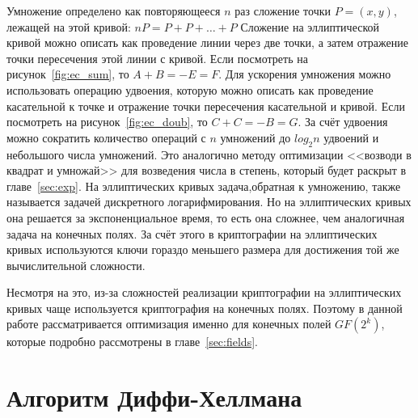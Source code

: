 \documentclass[times,specification,annotation]{itmo-student-thesis}
\begin{document}
Умножение определено как повторяющееся $n$ раз сложение точки $P=(x,y)$, лежащей на этой кривой: $nP=P+P+\dots+P$
Сложение на эллиптической кривой можно описать как проведение линии через две точки, а затем отражение точки пересечения этой линии с кривой.
Если посмотреть на рисунок~\ref{fig:ec_sum}, то $A+B=-E=F$.
Для ускорения умножения можно использовать операцию удвоения, которую можно описать как проведение касательной к точке и
отражение точки пересечения касательной и кривой.
Если посмотреть на рисунок~\ref{fig:ec_doub}, то $C+C=-B=G$.
За счёт удвоения можно сократить количество операций с $n$ умножений до $log_2 n$ удвоений и небольшого числа умножений.
Это аналогично методу оптимизации <<возводи в квадрат и умножай>> для возведения числа в степень, который будет раскрыт в главе~\ref{sec:exp}.
На эллиптических кривых задача,обратная к умножению, также называется задачей дискретного логарифмирования.
Но на эллиптических кривых она решается за экспоненциальное время, то есть она сложнее, чем аналогичная задача на конечных полях.
За счёт этого в криптографии на эллиптических кривых используются ключи гораздо меньшего размера для достижения той же вычислительной сложности.\par
Несмотря на это, из-за сложностей реализации криптографии на эллиптических кривых чаще используется криптография на конечных полях.
Поэтому в данной работе рассматривается оптимизация именно для конечных полей $GF(2^k)$, которые подробно рассмотрены в главе~\ref{sec:fields}.


\section{Алгоритм Диффи-Хеллмана}\label{sec:dhke}
\end{document}
